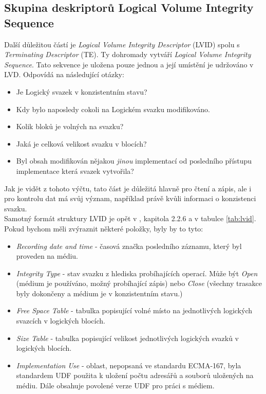 \subsection{Skupina deskriptorů Logical Volume Integrity Sequence}
\label{subsec:lvid}
Další důležitou částí je \textit{Logical Volume Integrity Descriptor} (LVID) spolu s \textit{Terminating Descriptor} (TE). Ty dohromady vytváří \textit{Logical Volume Integrity Sequence}. Tato sekvence je uložena pouze jednou a její umístění je udržováno v LVD. Odpovídá na následující otázky:
\begin{itemize}
    \item Je Logický svazek v konzistentním stavu?
    \item Kdy bylo naposledy cokoli na Logickém svazku modifikováno.
    \item Kolik bloků je volných na svazku?
    \item Jaká je celková velikost svazku v blocích?
    \item Byl obsah modifikován nějakou \textit{jinou} implementací od posledního přístupu implementace která svazek vytvořila?
\end{itemize}
Jak je vidět z tohoto výčtu, tato část je důležitá hlavně pro čtení a zápis, ale i pro kontrolu dat má svůj význam, například právě kvůli informaci o konzistenci svazku.\\ 
Samotný formát struktury LVID je opět v \cite{osta-udf-0201}, kapitola 2.2.6 a v tabulce \ref{tab:lvid}.\\
Pokud bychom měli zvýraznit některé položky, byly by to tyto:
\begin{itemize}
    \item \textit{Recording date and time} - časová značka posledního záznamu, který byl proveden na médiu.
    \item \textit{Integrity Type} - stav svazku z hlediska probíhajících operací. Může být \textit{Open} (médium je používáno, možný probíhající zápis) nebo \textit{Close} (všechny trasakce byly dokončeny a médium je v konzistentním stavu.)
    \item \textit{Free Space Table} - tabulka popisující volné místo na jednotlivých logických svazcích v logických blocích.
    \item \textit{Size Table} - tabulka popisující velikost jednotlivých logických svazků v logických blocích.
    \item \textit{Implementation Use} - oblast, nepopsaná ve standardu ECMA-167, byla standardem UDF použita k uložení počtu adresářů a souborů uložených na médiu. Dále obsahuje povolené verze UDF pro práci s médiem. 
\end{itemize}
